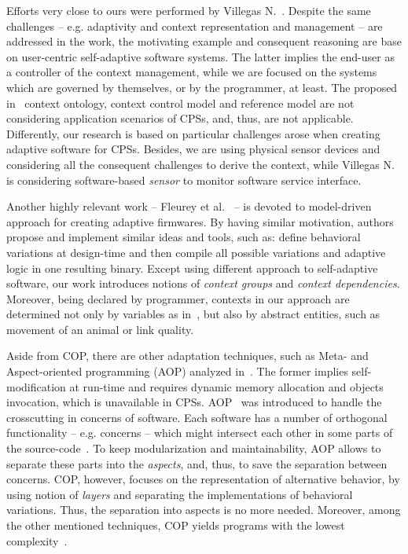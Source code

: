 Efforts very close to ours were performed by Villegas N.~\cite{VilegasPhD11}.
Despite the same challenges -- e.g. adaptivity and context representation and
management -- are addressed in the work, the motivating example and consequent
reasoning are base on user-centric self-adaptive software systems. The latter
implies the end-user as a controller of the context management, while we are
focused on the systems which are governed by themselves, or by the programmer,
at least. The proposed in~\cite{VilegasPhD11} context ontology, context control
model and reference model are not considering application scenarios of CPSs,
and, thus, are not applicable. Differently, our research is based on particular
challenges arose when creating adaptive software for CPSs. Besides, we are using
physical sensor devices and considering all the consequent challenges to derive
the context, while Villegas N.~\cite{VilegasPhD11} is considering software-based
\emph{sensor} to monitor software service interface.

Another highly relevant work -- Fleurey et
al.~\cite{Fleureya-adaptive-firmwares11} -- is devoted to model-driven approach
for creating adaptive firmwares. By having similar motivation, authors propose
and implement similar ideas and tools, such as: define behavioral variations at
design-time and then compile all possible variations and adaptive logic in one
resulting binary. Except using different approach to self-adaptive software, our
work introduces notions of \emph{context groups} and \emph{context
dependencies}. Moreover, being declared by programmer, contexts in our approach
are determined not only by variables as in~\cite{Fleureya-adaptive-firmwares11},
but also by abstract entities, such as movement of an animal or link quality.

Aside from COP, there are other adaptation techniques, such as Meta- and
Aspect-oriented programming (AOP) analyzed
in~\cite{Salvaneschi:lang_support_for_sas:11}. The former implies
self-modification at run-time and requires dynamic memory allocation and objects
invocation, which is unavailable in CPSs. AOP~\cite{Kiczales:AOP:97} was
introduced to handle the crosscutting in concerns of software. Each software has
a number of orthogonal functionality -- e.g. concerns -- which might intersect
each other in some parts of the source-code~\cite{Tarr:concerns:99}. To keep
modularization and maintainability, AOP allows to separate these parts into the
\emph{aspects}, and, thus, to save the separation between concerns. COP,
however, focuses on the representation of alternative behavior, by using notion
of \emph{layers} and separating the implementations of behavioral variations.
Thus, the separation into aspects is no more needed. Moreover, among the other
mentioned techniques, COP yields programs with the lowest
complexity~\cite{Salvaneschi:lang_support_for_sas:11}.


